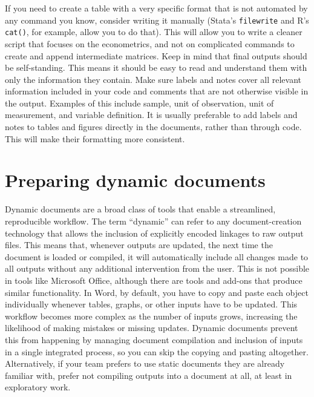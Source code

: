 If you need to create a table with a very specific format
that is not automated by any command you know, consider writing it manually
(Stata's \texttt{filewrite} and R's \texttt{cat()}, for example, allow you to do that).
This will allow you to write a cleaner script that focuses on the econometrics,
and not on complicated commands to create and append intermediate matrices.
Keep in mind that final outputs should be self-standing.
This means it should be easy to read and understand them with only the information they contain.
Make sure labels and notes cover all relevant information 
included in your code and comments that are not otherwise visible in the output.
Examples of this include sample, 
unit of observation, unit of measurement, and variable definition.
It is usually preferable to add labels and notes to tables and figures 
directly in the documents, rather than through code.
This will make their formatting more consistent.

\section{Preparing dynamic documents}

Dynamic documents are a broad class of tools that enable a streamlined, reproducible workflow.
The term ``dynamic'' can refer to any document-creation technology
that allows the inclusion of explicitly encoded linkages to raw output files.
This means that, whenever outputs are updated,
the next time the document is loaded or compiled, it will automatically include
all changes made to all outputs without any additional intervention from the user.
This is not possible in tools like Microsoft Office,
although there are tools and add-ons that produce similar functionality.
In Word, by default, you have to copy and paste each object individually
whenever tables, graphs, or other inputs have to be updated.
This workflow becomes more complex as the number of inputs grows,
increasing the likelihood of making mistakes or missing updates.
Dynamic documents prevent this from happening by managing document compilation and
inclusion of inputs in a single integrated process,
so you can skip the copying and pasting altogether.
Alternatively, if your team prefers to use static documents they are already familiar with,
prefer not compiling outputs into a document at all, at least in exploratory work.

